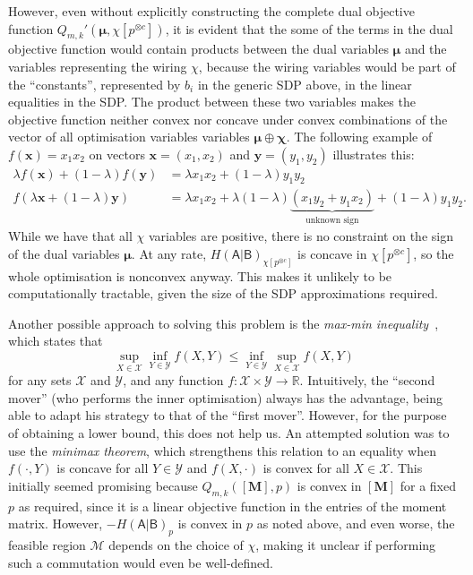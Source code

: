 \documentclass[10pt, a4paper]{article}
\numberwithin{equation}{section} %
\theoremstyle{definition}
\theoremstyle{plain}
\newcommand{\?}{\mathrel{?}} %
\newcommand{\R}{\mathbb{R}} %
\newcommand{\cvec}[1]{\boldsymbol{\mathbf{#1}}}    %
\newcommand{\matr}[2][]{\left[\mathbf{#2}#1\right]} %
\newcommand{\sM}{\mathcal{M}}
\newcommand{\sX}{\mathcal{X}}
\newcommand{\sY}{\mathcal{Y}}
\newcommand{\crv}[1]{\mathsf{#1}}
\begin{document}
                        However, even without explicitly constructing the complete dual objective function \(Q_{m,k}'(\cvec{\mu},\chi[p^{\otimes c}])\), it is evident that the some of the terms in the dual objective function would contain products between the dual variables \(\cvec{\mu}\) and the variables representing the wiring \(\chi\), because the wiring variables would be part of the ``constants'', represented by \(b_i\) in the generic SDP above, in the linear equalities in the SDP\@. The product between these two variables makes the objective function neither convex nor concave under convex combinations of the vector of all optimisation variables variables \(\cvec{\mu} \oplus \cvec{\chi}\). The following example of \(f(\cvec{x}) = x_1x_2\) on vectors \(\cvec{x} = (x_1, x_2)\) and \(\cvec{y} = (y_1, y_2)\) illustrates this:
                        \begin{align}
                          \lambda f(\cvec{x}) + (1-\lambda)f(\cvec{y}) &= \lambda{x_1x_2} + (1-\lambda){y_1y_2} \\
                          f(\lambda\cvec{x} + (1-\lambda)\cvec{y}) &= \lambda{x_1x_2} + \lambda(1-\lambda)\underbrace{(x_1y_2 + y_1x_2)}_{\text{unknown sign}} + (1-\lambda){y_1y_2}.
                        \end{align}
                        While we have that all \(\chi\) variables are positive, there is no constraint on the sign of the dual variables \(\cvec{\mu}\). At any rate, \(H{(\crv{A}|\crv{B})}_{\chi[p^{\otimes c}]}\) is concave in \(\chi[p^{\otimes c}]\), so the whole optimisation is nonconvex anyway. This makes it unlikely to be computationally tractable, given the size of the SDP approximations required.

                        Another possible approach to solving this problem is the \emph{max-min inequality}~\cite[Sec. 5.4]{BoydVand}, which states that 
                        \begin{equation}
                          \sup_{X\in\sX} \inf_{Y\in\sY} f(X,Y) \leq \inf_{Y\in\sY} \sup_{X\in\sX} f(X,Y)
                        \end{equation}
                        for any sets \(\sX\) and \(\sY\), and any function \(f : \sX\times\sY \to \R\). Intuitively, the ``second mover'' (who performs the inner optimisation) always has the advantage, being able to adapt his strategy to that of the ``first mover''. However, for the purpose of obtaining a lower bound, this does not help us. An attempted solution was to use the \emph{minimax theorem}, which strengthens this relation to an equality when \(f(\cdot,Y)\) is concave for all \(Y\in\sY\) and \(f(X,\cdot)\) is convex for all \(X\in\sX\). This initially seemed promising because \(Q_{m,k}(\matr{M}, p)\) is convex in \(\matr{M}\) for a fixed \(p\) as required, since it is a linear objective function in the entries of the moment matrix. However, \(-H{(\crv{A}|\crv{B})}_p\) is convex in \(p\) as noted above, and even worse, the feasible region \(\sM\) depends on the choice of \(\chi\), making it unclear if performing such a commutation would even be well-defined.
\end{document}
